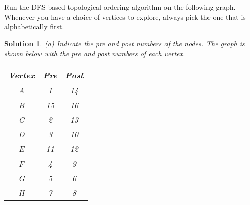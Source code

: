 \documentclass[boxes]{rutgers_hw}
\newtheorem*{solutions}{Solution}
\begin{document}
    \begin{exern}{3.3}
        Run the DFS-based topological ordering algorithm on the following graph. Whenever you have a choice of vertices to explore, always pick the one that is alphabetically first.
    \end{exern}
    \begin{solutions}
        (a) Indicate the pre and post numbers of the nodes.
        The graph is shown below with the pre and post numbers of each vertex.
        \begin{center}
        \end{center}

        \begin{center}
            \begin{tabular}{|c|c|c|}
                \hline
                Vertex & Pre & Post \\
                \hline
                A & 1 & 14 \\
                B & 15 & 16 \\
                C & 2 & 13 \\
                D & 3 & 10 \\
                E & 11 & 12 \\
                F & 4 & 9 \\
                G & 5 & 6 \\
                H & 7 & 8 \\
                \hline
            \end{tabular}
        \end{center}
    \end{solutions}
\end{document}
